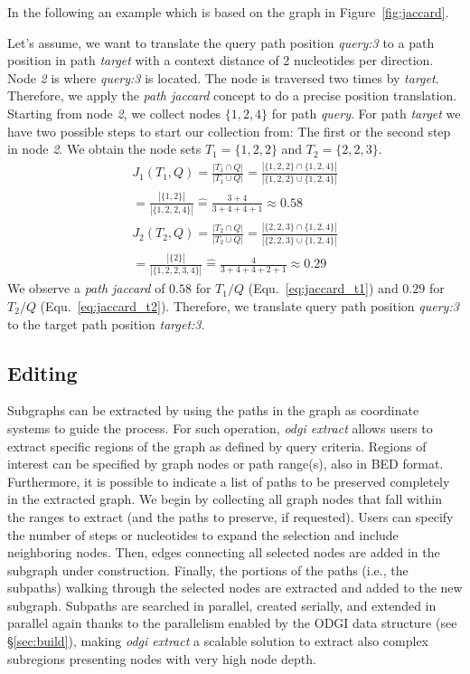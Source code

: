 \documentclass{bioinfo}
\begin{document}
In the following an example which is based on the graph in Figure~\ref{fig:jaccard}.

Let's assume, we want to translate the query path position \textit{query:3} to a path position in path \textit{target} with a context distance of 2 nucleotides per direction. Node \textit{2} is where \textit{query:3} is located. The node is traversed two times by \textit{target}. Therefore, we apply the \textit{path jaccard} concept to do a precise position translation. Starting from node \textit{2}, we collect nodes $\{1,2,4\}$ for path \textit{query}. For path \textit{target} we have two possible steps to start our collection from: The first or the second step in node \textit{2}. We obtain the node sets $T_1=\{1,2,2\}$ and $T_2=\{2,2,3\}$.
\begin{multline}
	J_1(T_1,Q)=\frac{|T_1\cap Q|}{|T_1\cup Q|}=\frac{|\{1,2,2\}\cap \{1,2,4\}|}{|\{1,2,2\}\cup \{1,2,4\}|}\\=\frac{|\{1,2\}|}{|\{1,2,2,4\}|}\widehat{=}\frac{3+4}{3+4+4+1}\approx0.58
	\label{eq:jaccard_t1}
\end{multline}
\begin{multline}
	J_2(T_2,Q)=\frac{|T_2\cap Q|}{|T_2\cup Q|}=\frac{|\{2,2,3\}\cap \{1,2,4\}|}{|\{2,2,3\}\cup \{1,2,4\}|}\\=\frac{|\{2\}|}{|\{1,2,2,3,4\}|}\widehat{=}\frac{4}{3+4+4+2+1}\approx0.29
	\label{eq:jaccard_t2}
\end{multline}
We observe a \textit{path jaccard} of $0.58$ for $T_1/Q$ (Equ.~\ref{eq:jaccard_t1}) and $0.29$ for $T_2/Q$ (Equ.~\ref{eq:jaccard_t2}).
Therefore, we translate query path position \textit{query:3} to the target path position \textit{target:3}.

\subsection{Editing}
\label{sec:supp_edit}
Subgraphs can be extracted by using the paths in the graph as coordinate systems to guide the process. For such operation, \textit{odgi extract} allows users to extract specific regions of the graph as defined by query criteria.
Regions of interest can be specified by graph nodes or path range(s), also in BED format. Furthermore, it is possible to indicate a list of paths to be preserved completely in the extracted graph.
We begin by collecting all graph nodes that fall within the ranges to extract (and the paths to preserve, if requested).
Users can specify the number of steps or nucleotides to expand the selection and include neighboring nodes.
Then, edges connecting all selected nodes are added in the subgraph under construction.
Finally, the portions of the paths (i.e., the subpaths) walking through the selected nodes are extracted and added to the new subgraph.
Subpaths are searched in parallel, created serially, and extended in parallel again thanks to the parallelism enabled by the ODGI data structure (see \S\ref{sec:build}), making \textit{odgi extract} a scalable solution to extract also complex subregions presenting nodes with very high node depth.
\end{document}
